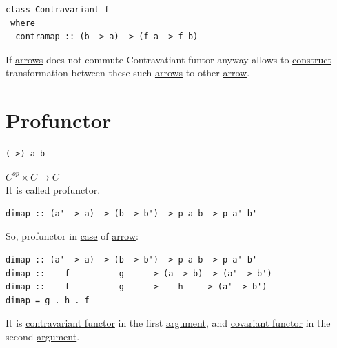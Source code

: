 \documentclass[a4paper,14pt,oneside]{book}
\begin{document}
\begin{verbatim}
class Contravariant f
 where
  contramap :: (b -> a) -> (f a -> f b)
\end{verbatim}


If \hyperref[org516b7ab]{arrows} does not commute Contravatiant funtor anyway allows to \hyperref[org95d345f]{construct} transformation between these such \hyperref[org516b7ab]{arrows} to other \hyperref[orga10ccdb]{arrow}.\\

\chapter{Profunctor}
\label{sec:org650b95d}

\begin{verbatim}
(->) a b
\end{verbatim}

\(C^{op} \times C \to C\)\\

It is called profunctor.\\

\begin{verbatim}
dimap :: (a' -> a) -> (b -> b') -> p a b -> p a' b'
\end{verbatim}

So, profunctor in \hyperref[orge2ba09c]{case} of \hyperref[orga10ccdb]{arrow}:\\


\begin{verbatim}
dimap :: (a' -> a) -> (b -> b') -> p a b -> p a' b'
dimap ::    f          g     -> (a -> b) -> (a' -> b') 
dimap ::    f          g     ->    h    -> (a' -> b')
dimap = g . h . f
\end{verbatim}

It is \hyperref[org5884f9d]{contravariant functor} in the first \hyperref[org8cb9182]{argument}, and \hyperref[orgba2bdc2]{covariant functor} in the second \hyperref[org8cb9182]{argument}.\\
\end{document}
